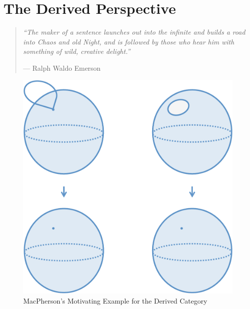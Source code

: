 
%
%

\chapter{The Derived Perspective}
\label{sec:derived}

\begin{quote}
{\em``The maker of a sentence launches out into the infinite and builds a road into Chaos and old Night, and is followed by those who hear him with something of wild, creative delight.''}
\begin{flushright} --- Ralph Waldo Emerson~\cite[p.59]{emerson-journals} \end{flushright}
\end{quote}

 \begin{figure}
    \centering
    \includegraphics[width=\textwidth]{derived_category_bold.pdf}
    \caption{MacPherson's Motivating Example for the Derived Category}
    \label{fig:derived_category}
\end{figure}

